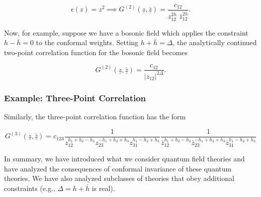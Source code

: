 \begin{equation}
\epsilon (z) = z^2 \implies G^{(2)}(\underline{z}, \underline{\bar{z}}) = \frac{c_{12}}{z_{12}^{2h} \, \, \bar{z}_{12}^{2\bar{h}}}.
\end{equation}

\noindent Now, for example, suppose we have a bosonic field which applies the constraint $h-\bar{h}=0$ to the conformal weights. Setting $h+\bar{h} = \Delta$, the analytically continued two-point correlation function for the bosonic field becomes

\begin{equation}
G^{(2)}(\underline{z}, \underline{\bar{z}}) = \frac{c_{12}}{|z_{12}|^{2\Delta}}.
\end{equation}

\subsubsection*{Example: Three-Point Correlation}

\noindent Similarly, the three-point correlation function has the form

\begin{equation}
G^{(3)} (\underline{z}, \underline{\bar{z}}) = c_{123} \frac{1}{z_{12}^{h_1+h_2-h_3} z_{23}^{-h_1+h_2+h_3} z_{31}^{h_1-h_2+h_3}} \frac{1}{\bar{z}_{12}^{h_1+h_2-h_3} \bar{z}_{23}^{-h_1+h_2+h_3} \bar{z}_{31}^{h_1-h_2+h_3}}
\end{equation}

\noindent In summary, we have introduced what we consider quantum field theories and have analyzed the consequences of conformal invariance of these quantum theories. We have also analyzed subclasses of theories that obey additional constraints (e.g., $\Delta = h + \bar{h}$ is real).
